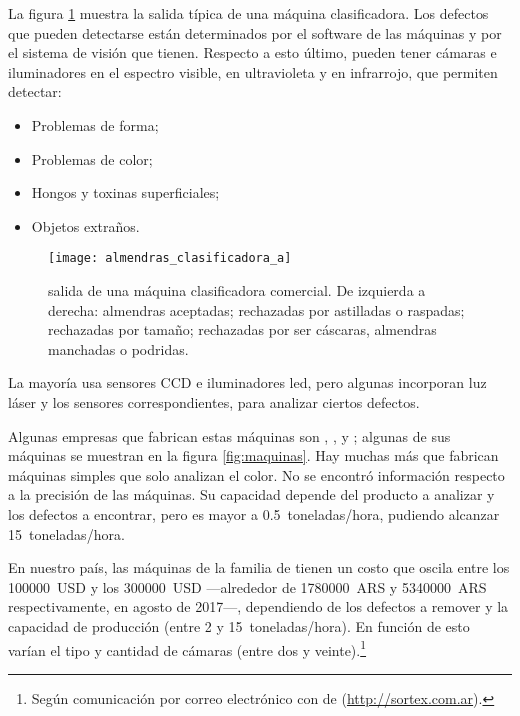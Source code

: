 La figura \ref{fig:salidamaquina} muestra la salida típica de una máquina clasificadora. Los defectos que pueden detectarse están determinados por el software de las máquinas y por el sistema de visión que tienen. Respecto a esto último, pueden tener cámaras e iluminadores en el espectro visible, en ultravioleta y en infrarrojo, que permiten detectar:
\begin{itemize}
\item Problemas de forma;
\item Problemas de color;
\item Hongos y toxinas superficiales;
\item Objetos extraños.
\end{itemize}



\begin{figure}[hbtp]
\centering
\texttt{[image: almendras\_clasificadora\_a]}
\caption[Salida de una máquina clasificadora comercial]{salida de una máquina clasificadora comercial. De izquierda a derecha: almendras aceptadas; rechazadas por astilladas o raspadas; rechazadas por tamaño; rechazadas por ser cáscaras, almendras manchadas o podridas.~\autocite{imagenes:almendrasclasificadas}}
\label{fig:salidamaquina}
\end{figure}


La mayoría usa sensores CCD e iluminadores led, pero algunas incorporan luz láser y los sensores correspondientes, para analizar ciertos defectos. 

Algunas empresas que fabrican estas máquinas son , ,  y ; algunas de sus máquinas se muestran en la figura \ref{fig:maquinas}. Hay muchas más que fabrican máquinas simples que solo analizan el color. No se encontró información respecto a la precisión de las máquinas. Su capacidad depende del producto a analizar y los defectos a encontrar, pero es mayor a \SI{0,5}{toneladas/hora}, pudiendo alcanzar \SI{15}{toneladas/hora}.

En nuestro país, las máquinas de la familia  de  tienen un costo que oscila entre los \SI{100000}{USD} y los \SI{300000}{USD} ---alrededor de \SI{1780000}{ARS} y \SI{5340000}{ARS} respectivamente, en agosto de 2017---, dependiendo de los defectos a remover y la capacidad de producción (entre \num{2} y \SI{15}{toneladas/hora}). En función de esto varían el tipo y cantidad de cámaras (entre dos y veinte).\footnote{Según comunicación por correo electrónico con  de  (\url{http://sortex.com.ar}).}



